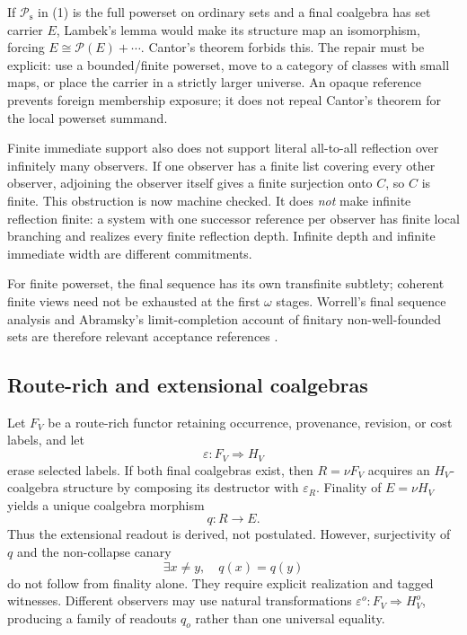 \documentclass[11pt]{article}
\theoremstyle{definition}
\theoremstyle{remark}
\newcommand{\Ps}{\mathcal{P}_{\mathrm{s}}}
\begin{document}
If $\Ps$ in (1) is the full powerset on ordinary sets and a final coalgebra has
set carrier $E$, Lambek's lemma would make its structure map an isomorphism,
forcing $E\cong\mathcal P(E)+\cdots$.  Cantor's theorem forbids this.  The repair
must be explicit: use a bounded/finite powerset, move to a category of classes
with small maps, or place the carrier in a strictly larger universe.  An opaque
reference prevents foreign membership exposure; it does not repeal Cantor's
theorem for the local powerset summand.

Finite immediate support also does not support literal all-to-all reflection over
infinitely many observers.  If one observer has a finite list covering every
other observer, adjoining the observer itself gives a finite surjection onto
$C$, so $C$ is finite.  This obstruction is now machine checked.  It does
\emph{not} make infinite reflection finite: a system with one successor reference
per observer has finite local branching and realizes every finite reflection
depth.  Infinite depth and infinite immediate width are different commitments.

For finite powerset, the final sequence has its own transfinite subtlety; coherent
finite views need not be exhausted at the first $\omega$ stages.  Worrell's final
sequence analysis and Abramsky's limit-completion account of finitary
non-well-founded sets are therefore relevant acceptance references
\cite{WorrellFinalSequence,AbramskyFinitary}.

\subsection{Route-rich and extensional coalgebras}

Let $F_V$ be a route-rich functor retaining occurrence, provenance, revision, or
cost labels, and let
\[
  \varepsilon:F_V\Longrightarrow H_V
\]
erase selected labels.  If both final coalgebras exist, then
$R=\nu F_V$ acquires an $H_V$-coalgebra structure by composing its destructor
with $\varepsilon_R$.  Finality of $E=\nu H_V$ yields a unique coalgebra morphism
\[
  q:R\longrightarrow E.                                  \tag{2}
\]
Thus the extensional readout is derived, not postulated.  However, surjectivity of
$q$ and the non-collapse canary
\[
  \exists x\ne y,\quad q(x)=q(y)                          \tag{3}
\]
do not follow from finality alone.  They require explicit realization and tagged
witnesses.  Different observers may use natural transformations
$\varepsilon^o:F_V\Rightarrow H^o_V$, producing a family of readouts $q_o$ rather
than one universal equality.
\end{document}
